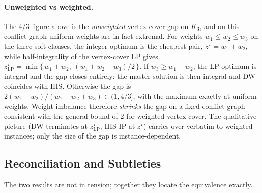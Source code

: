 \paragraph{Unweighted vs weighted.} The $4/3$ figure above is the
\emph{unweighted} vertex-cover gap on $K_3$, and on this conflict graph uniform
weights are in fact extremal. For weights $w_1 \le w_2 \le w_3$ on the three
soft clauses, the integer optimum is the cheapest pair, $z^\star = w_1 + w_2$,
while half-integrality of the vertex-cover LP gives
$z^\star_{\mathrm{LP}} = \min\{\, w_1 + w_2,\ (w_1 + w_2 + w_3)/2 \,\}$. If
$w_3 \ge w_1 + w_2$, the LP optimum is integral and the gap closes entirely: the
master solution is then integral and DW coincides with IHS. Otherwise the gap
is $2(w_1+w_2)/(w_1+w_2+w_3) \in (1, 4/3]$, with the maximum exactly at
uniform weights. Weight imbalance therefore \emph{shrinks} the gap on a fixed
conflict graph---consistent with the general bound of $2$ for weighted vertex
cover. The qualitative picture (DW terminates at $z^\star_{\mathrm{LP}}$, IHS-IP
at $z^\star$) carries over verbatim to weighted instances; only the size of
the gap is instance-dependent.

\subsection{Reconciliation and Subtleties}
\label{sec:subtle}

The two results are not in tension; together they locate the equivalence
exactly.

